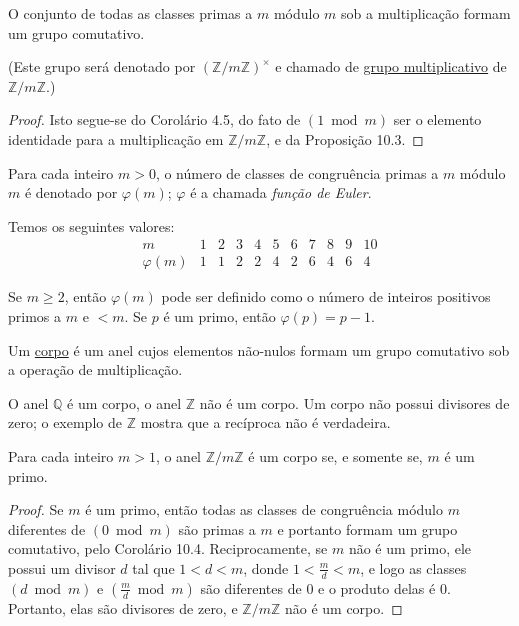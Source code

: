 \begin{corolario}
O conjunto de todas as classes primas a $m$ módulo $m$ sob a multiplicação formam um grupo comutativo.
\end{corolario}

(Este grupo será denotado por $(\mathbb{Z}/m\mathbb{Z})^\times$ e chamado de \underline{grupo multiplicativo} de 
$\mathbb{Z}/m\mathbb{Z}$.)

\begin{proof}
Isto segue-se do Corolário 4.5, do fato de $(1 \bmod m)$ ser o elemento identidade para a multiplicação 
em $\mathbb{Z}/m\mathbb{Z}$, e da Proposição 10.3.
\end{proof}

\begin{definicao}
Para cada inteiro $m > 0$, o número de classes de congruência primas a $m$ módulo $m$ é denotado 
por $\varphi(m)$; $\varphi$ é a chamada \emph{função de Euler}.
\end{definicao}

Temos os seguintes valores:
\[
\begin{array}{c|cccccccccc}
m      & 1 & 2 & 3 & 4 & 5 & 6 & 7 & 8 & 9 & 10 \\ \hline
\varphi(m) & 1 & 1 & 2 & 2 & 4 & 2 & 6 & 4 & 6 & 4
\end{array}
\]

Se $m \geq 2$, então $\varphi(m)$ pode ser definido como o número de inteiros positivos primos a 
$m$ e $< m$. Se $p$ é um primo, então $\varphi(p) = p - 1$.

\begin{definicao}
Um \underline{corpo} é um anel cujos elementos não-nulos formam um grupo comutativo sob a operação de multiplicação.    
\end{definicao}

O anel $\mathbb{Q}$ é um corpo, o anel $\mathbb{Z}$ não é um corpo. Um corpo não possui divisores de zero; o exemplo 
de $\mathbb{Z}$ mostra que a recíproca não é verdadeira.

\begin{proposicao}
Para cada inteiro $m > 1$, o anel $\mathbb{Z}/m\mathbb{Z}$ é um corpo se, e somente se, $m$ é um primo.
\end{proposicao}

\begin{proof}
Se $m$ é um primo, então todas as classes de congruência módulo $m$ diferentes de $(0 \bmod m)$ são primas 
a $m$ e portanto formam um grupo comutativo, pelo Corolário 10.4. Reciprocamente, se $m$ não é um primo, ele 
possui um divisor $d$ tal que $1 < d < m$, donde $1 < \frac{m}{d} < m$, e logo as classes $(d \bmod m)$ e 
$\left(\frac{m}{d} \bmod m\right)$ são diferentes de $0$ e o produto delas é $0$. Portanto, elas são divisores 
de zero, e $\mathbb{Z}/m\mathbb{Z}$ não é um corpo.
\end{proof}

